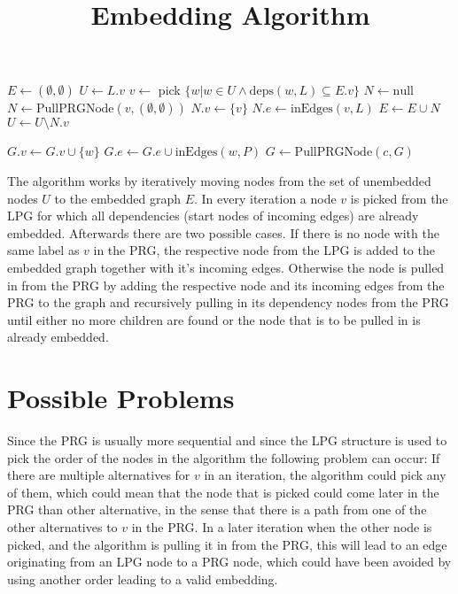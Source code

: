 \documentclass[a4paper]{article}
\title{Embedding Algorithm}
\date{}
\author{}
\begin{document}
\maketitle
\begin{algorithmic}
    \State $E \gets (\emptyset,\emptyset)$
    \State $U \gets L.v$
      \State $v \gets$ pick $\{w|w \in U \land \mathrm{deps}(w,L) \subseteq E.v\}$
      \State $N \gets \mathrm{null}$
       
        \State $N \gets \mathrm{PullPRGNode}(v,(\emptyset,\emptyset))$
      \EndIf
       
        \State $N.v \gets \{v\}$
        \State $N.e \gets \mathrm{inEdges}(v,L)$
      \EndIf
      \State $E \gets E \cup N$
      \State $U \gets U \setminus N.v$
    \EndWhile
    \State {}

    \State
        \State $G.v \gets G.v \cup \{w\}$
        \State $G.e \gets G.e \cup \mathrm{inEdges}(w,P)$
          \State $G \gets \mathrm{PullPRGNode}(c,G)$
        \EndFor
      \EndIf
      \State {}
    \EndFunction
  \EndFunction
\end{algorithmic}

The algorithm works by iteratively moving nodes from the set of unembedded nodes
$U$ to the embedded graph $E$. In every iteration a node $v$ is picked from the
LPG for which all dependencies (start nodes of incoming edges) are already
embedded.  Afterwards there are two possible cases. If there is no node with the
same label as $v$ in the PRG, the respective node from the LPG is added to the
embedded graph together with it's incoming edges. Otherwise the node is pulled
in from the PRG by adding the respective node and its incoming edges from the
PRG to the graph and recursively pulling in its dependency nodes from the PRG
until either no more children are found or the node that is to be pulled in is
already embedded.

\section*{Possible Problems}
Since the PRG is usually more sequential and since the LPG structure is used to
pick the order of the nodes in the algorithm the following problem can occur: If
there are multiple alternatives for $v$ in an iteration, the algorithm could
pick any of them, which could mean that the node that is picked could come
later in the PRG than other alternative, in the sense that there is a path from
one of the other alternatives to $v$ in the PRG. In a later iteration when
the other node is picked, and the algorithm is pulling it in from the PRG, this
will lead to an edge originating from an LPG node to a PRG node, which could
have been avoided by using another order leading to a valid embedding.
\end{document}
